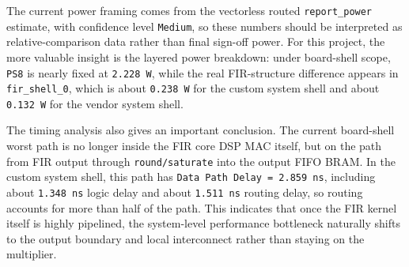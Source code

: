 The current power framing comes from the vectorless routed \texttt{report\_power} estimate, with confidence level \texttt{Medium}, so these numbers should be interpreted as relative-comparison data rather than final sign-off power. For this project, the more valuable insight is the layered power breakdown: under board-shell scope, \texttt{PS8} is nearly fixed at \texttt{2.228 W}, while the real FIR-structure difference appears in \texttt{fir\_shell\_0}, which is about \texttt{0.238 W} for the custom system shell and about \texttt{0.132 W} for the vendor system shell.

The timing analysis also gives an important conclusion. The current board-shell worst path is no longer inside the FIR core DSP MAC itself, but on the path from FIR output through \texttt{round/saturate} into the output FIFO BRAM. In the custom system shell, this path has \texttt{Data Path Delay = 2.859 ns}, including about \texttt{1.348 ns} logic delay and about \texttt{1.511 ns} routing delay, so routing accounts for more than half of the path. This indicates that once the FIR kernel itself is highly pipelined, the system-level performance bottleneck naturally shifts to the output boundary and local interconnect rather than staying on the multiplier.
